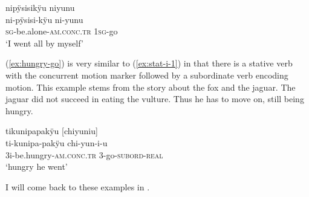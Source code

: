 \ea\label{ex:stat-noi-1}
\begingl
\glpreamble nipÿsisikÿu niyunu\\
\gla ni-pÿsisi-kÿu ni-yunu\\
\textsc{sg}-be.alone-\textsc{am.conc.tr} 1\textsc{sg}-go\\
\glft ‘I went all by myself’
\endgl
\trailingcitation{[jxx-p120430l-2.250]}
\xe

(\ref{ex:hungry-go}) is very similar to (\ref{ex:stat-i-1}) in that there is a stative verb with the concurrent motion marker followed by a subordinate verb encoding motion. This example stems from the story about the fox and the jaguar. The jaguar did not succeed in eating the vulture. Thus he has to move on, still being hungry.

\ea\label{ex:hungry-go}
\begingl
\glpreamble tikunipapakÿu \textup{[}chiyuniu\textup{]}\\
\gla ti-kunipa-pakÿu chi-yun-i-u\\
\glb 3i-be.hungry-\textsc{am.conc.tr} 3-go-\textsc{subord}-\textsc{real}\\
\glft ‘hungry he went’
\endgl
\trailingcitation{[jmx-n120429ls-x5.222]}
\xe

I will come back to these examples in .

%


